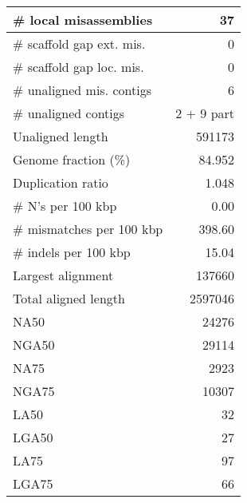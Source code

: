 \documentclass[12pt,a4paper]{article}
\begin{document}
\begin{table}[ht]
\begin{center}
\begin{tabular}{|l*{1}{|r}|}
\# local misassemblies & 37 \\ \hline
\# scaffold gap ext. mis. & 0 \\ \hline
\# scaffold gap loc. mis. & 0 \\ \hline
\# unaligned mis. contigs & 6 \\ \hline
\# unaligned contigs & 2 + 9 part \\ \hline
Unaligned length & 591173 \\ \hline
Genome fraction (\%) & 84.952 \\ \hline
Duplication ratio & 1.048 \\ \hline
\# N's per 100 kbp & 0.00 \\ \hline
\# mismatches per 100 kbp & 398.60 \\ \hline
\# indels per 100 kbp & 15.04 \\ \hline
Largest alignment & 137660 \\ \hline
Total aligned length & 2597046 \\ \hline
NA50 & 24276 \\ \hline
NGA50 & 29114 \\ \hline
NA75 & 2923 \\ \hline
NGA75 & 10307 \\ \hline
LA50 & 32 \\ \hline
LGA50 & 27 \\ \hline
LA75 & 97 \\ \hline
LGA75 & 66 \\ \hline
\end{tabular}
\end{center}
\end{table}
\end{document}
